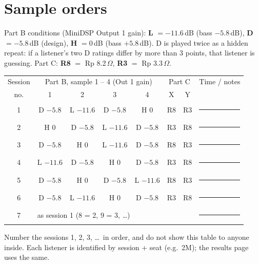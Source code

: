 \documentclass[11pt,a4paper]{article}
\begin{document}
\section{Sample orders}
Part B conditions (MiniDSP Output 1 gain): \textbf{L} $=-11.6$\,dB (bass $-5.8$\,dB), \textbf{D} $=-5.8$\,dB (design),
\textbf{H} $=0$\,dB (bass $+5.8$\,dB). D is played twice as a hidden repeat: if a listener's two D ratings differ by more than 3 points,
that listener is guessing. Part C: \textbf{R8} $=$ Rp 8.2\,$\Omega$, \textbf{R3} $=$ Rp 3.3\,$\Omega$.

\begin{center}
\renewcommand{\arraystretch}{1.25}
\begin{tabular}{@{}c|cccc|cc|l@{}}\toprule
Session & \multicolumn{4}{c|}{Part B, sample 1 -- 4 (Out 1 gain)} & \multicolumn{2}{c|}{Part C} & Time / notes\\
no. & 1 & 2 & 3 & 4 & X & Y & \\\midrule
1 & D $-5.8$ & L $-11.6$ & D $-5.8$ & H $0$ & R8 & R3 & \rule{4cm}{0.4pt}\\
2 & H $0$ & D $-5.8$ & L $-11.6$ & D $-5.8$ & R3 & R8 & \rule{4cm}{0.4pt}\\
3 & D $-5.8$ & H $0$ & L $-11.6$ & D $-5.8$ & R8 & R3 & \rule{4cm}{0.4pt}\\
4 & L $-11.6$ & D $-5.8$ & H $0$ & D $-5.8$ & R3 & R8 & \rule{4cm}{0.4pt}\\
5 & D $-5.8$ & H $0$ & D $-5.8$ & L $-11.6$ & R8 & R3 & \rule{4cm}{0.4pt}\\
6 & D $-5.8$ & L $-11.6$ & H $0$ & D $-5.8$ & R3 & R8 & \rule{4cm}{0.4pt}\\\midrule
7 & \multicolumn{6}{l|}{as session 1 \quad(8 = 2, 9 = 3, \dots)} & \rule{4cm}{0.4pt}\\\bottomrule
\end{tabular}
\end{center}
Number the sessions 1, 2, 3, \dots\ in order, and do not show this table to anyone inside. Each listener is identified by session + seat (e.g.\ 2M); the results page uses the same.
\end{document}
